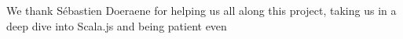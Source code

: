 We thank S\'{e}bastien Doeraene for helping us all along this project,
taking us in a deep dive into Scala.js and being patient even 